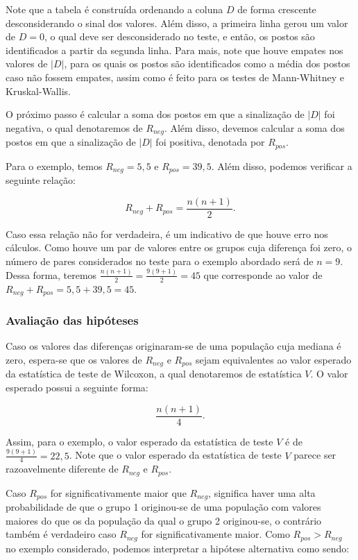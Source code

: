 \documentclass[
  letterpaper,
  DIV=11,
  numbers=noendperiod]{scrreprt}
\begin{document}
Note que a tabela é construída ordenando a coluna \(D\) de forma
crescente desconsiderando o sinal dos valores. Além disso, a primeira
linha gerou um valor de \(D = 0\), o qual deve ser desconsiderado no
teste, e então, os postos são identificados a partir da segunda linha.
Para mais, note que houve empates nos valores de \(|D|\), para os quais
os postos são identificados como a média dos postos caso não fossem
empates, assim como é feito para os testes de Mann-Whitney e
Kruskal-Wallis.

O próximo passo é calcular a soma dos postos em que a sinalização de
\(|D|\) foi negativa, o qual denotaremos de \(R_{neg}\). Além disso,
devemos calcular a soma dos postos em que a sinalização de \(|D|\) foi
positiva, denotada por \(R_{pos}\).

Para o exemplo, temos \(R_{neg} = 5,5\) e \(R_{pos} = 39,5\). Além
disso, podemos verificar a seguinte relação:

\[R_{neg} + R_{pos} =\displaystyle \frac{n(n+1)}{2}.\]

Caso essa relação não for verdadeira, é um indicativo de que houve erro
nos cálculos. Como houve um par de valores entre os grupos cuja
diferença foi zero, o número de pares considerados no teste para o
exemplo abordado será de \(n = 9\). Dessa forma, teremos
\(\displaystyle \frac{n(n+1)}{2} = \displaystyle \frac{9(9+1)}{2} = 45\)
que corresponde ao valor de \(R_{neg} + R_{pos} = 5,5 + 39,5 = 45.\)

\hypertarget{avaliauxe7uxe3o-das-hipuxf3teses-3}{%
\subsubsection{Avaliação das
hipóteses}\label{avaliauxe7uxe3o-das-hipuxf3teses-3}}

Caso os valores das diferenças originaram-se de uma população cuja
mediana é zero, espera-se que os valores de \(R_{neg}\) e \(R_{pos}\)
sejam equivalentes ao valor esperado da estatística de teste de
Wilcoxon, a qual denotaremos de estatística \(V\). O valor esperado
possui a seguinte forma:

\[\displaystyle \frac{n(n+1)}{4}.\]

Assim, para o exemplo, o valor esperado da estatística de teste \(V\) é
de \(\displaystyle \frac{9(9+1)}{4} = 22,5\). Note que o valor esperado
da estatística de teste \(V\) parece ser razoavelmente diferente de
\(R_{neg}\) e \(R_{pos}.\)

Caso \(R_{pos}\) for significativamente maior que \(R_{neg}\), significa
haver uma alta probabilidade de que o grupo 1 originou-se de uma
população com valores maiores do que os da população da qual o grupo 2
originou-se, o contrário também é verdadeiro caso \(R_{neg}\) for
significativamente maior. Como \(R_{pos} > R_{neg}\) no exemplo
considerado, podemos interpretar a hipótese alternativa como sendo:
\end{document}
